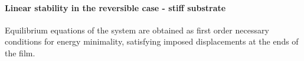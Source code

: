 \paragraph{Linear stability in the reversible case - stiff substrate}




Equilibrium equations of the system are obtained as first order necessary conditions for energy minimality, satisfying imposed displacements at the ends of the film.

